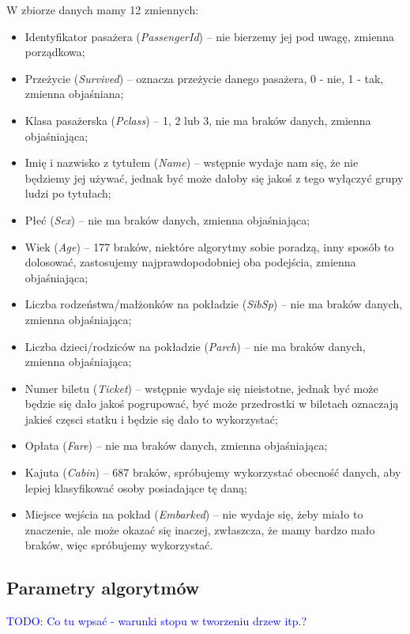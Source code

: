\documentclass{article}
\newcommand{\TODO}[1]{\textcolor{blue}{TODO: #1}}
\begin{document}
W zbiorze danych mamy 12 zmiennych:
\begin{itemize}
\item Identyfikator pasażera ({\itshape PassengerId}) -- nie bierzemy jej pod uwagę, zmienna porządkowa;
\item Przeżycie ({\itshape Survived}) -- oznacza przeżycie danego pasażera, 0 - nie, 1 - tak, zmienna objaśniana;
\item Klasa pasażerska ({\itshape Pclass}) -- 1, 2 lub 3, nie ma braków danych, zmienna objaśniająca;
\item Imię i nazwisko z tytułem ({\itshape Name}) -- wstępnie wydaje nam się, że nie będziemy jej używać, jednak być może dałoby się jakoś z tego wyłączyć grupy ludzi po tytułach;
\item Płeć ({\itshape Sex}) -- nie ma braków danych, zmienna objaśniająca;
\item Wiek ({\itshape Age}) -- 177 braków, niektóre algorytmy sobie poradzą, inny sposób to dolosować, zastosujemy najprawdopodobniej oba podejścia, zmienna objaśniająca;
\item Liczba rodzeństwa/małżonków na pokładzie ({\itshape SibSp}) -- nie ma braków danych, zmienna objaśniająca;
\item Liczba dzieci/rodziców na pokładzie ({\itshape Parch}) -- nie ma braków danych, zmienna objaśniająca;
\item Numer biletu ({\itshape Ticket}) -- wstępnie wydaje się nieistotne, jednak być może będzie się dało jakoś pogrupować, być może przedrostki w biletach oznaczają jakieś częsci statku i będzie się dało to wykorzystać;
\item Opłata ({\itshape Fare}) -- nie ma braków danych, zmienna objaśniająca;
\item Kajuta ({\itshape Cabin}) -- 687 braków, spróbujemy wykorzystać obecność danych, aby lepiej klasyfikować osoby posiadające tę daną;
\item Miejsce wejścia na pokład ({\itshape Embarked}) -- nie wydaje się, żeby miało to znaczenie, ale może okazać się inaczej, zwłaszcza, że mamy bardzo mało braków, więc spróbujemy wykorzystać.
\end{itemize}

\subsection{Parametry algorytmów}

\TODO{Co tu wpsać - warunki stopu w tworzeniu drzew itp.?}
\end{document}
